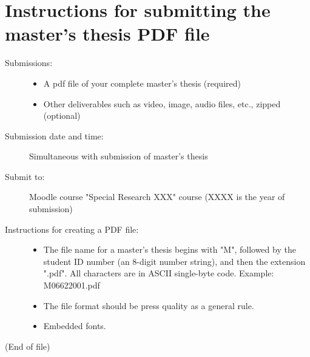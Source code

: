 
\appendix %
\chapter{Instructions for submitting the master's thesis PDF file}
\begin{description}
\item[Submissions:]
\begin{itemize}
\item A pdf file of your complete master's thesis (required)
\item Other deliverables such as video, image, audio files, etc., zipped (optional)
\end{itemize}
\item[Submission date and time:] Simultaneous with submission of master's thesis
\item[Submit to:] Moodle course "Special Research XXX" course (XXXX is the year of submission)
\item[Instructions for creating a PDF file:]
\begin{itemize}
\item The file name for a master's thesis begins with "M", followed by the student ID number (an 8-digit number string), and then the extension ".pdf". All characters are in ASCII single-byte code. Example: M06622001.pdf
\item The file format should be press quality as a general rule.
\item Embedded fonts.
\end{itemize}
\end{description}

(End of file)